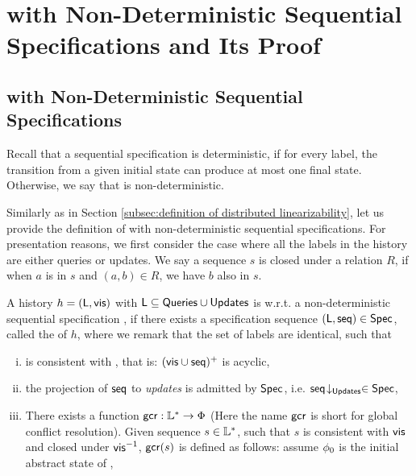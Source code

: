 \forget
{
\section{\crdtlin{} with Non-Deterministic Sequential Specifications and Its Proof}
\label{sec:appendix RA-linearizability with non-deterministic sequential specifications and its proof}



\subsection{\crdtlin{} with Non-Deterministic Sequential Specifications}
\label{subsec:appendix RA-linearizability with non-deterministic sequential specifications}

Recall that a sequential specification \Spec{} is deterministic, if for every label, the transition from a given initial state can produce at most one final state. Otherwise, we say that \Spec{} is non-deterministic.

Similarly as in Section \ref{subsec:definition of distributed linearizability}, let us provide the definition of \crdtlin{} with non-deterministic sequential specifications. For presentation reasons, we first consider the case where all the labels in the history are either queries or updates. We say a sequence $s$ is closed under a relation $R$, if when $a$ is in $s$ and $(a,b) \in R$, we have $b$ also in $s$.

\begin{definition}
\label{definition:ralinearizability1 with non-deterministic specifications}
A history $h = (\mathsf{L},\mathsf{vis})$ with $\mathsf{L}\subseteq \mathsf{Queries}\cup\mathsf{Updates}$ is \crdtlinearizable{} w.r.t. a non-deterministic sequential specification \Spec{}, if there exists a specification sequence $(\mathsf{L}, \mathsf{seq}) \in \mathsf{Spec}{}$, called the \emph{\crdtlinearization{}} of $h$, where we remark that the set of labels are identical, such that
\begin{enumerate}[(i)]
\item \aseqord{} is consistent with  \avisord{}, that is: $(\mathsf{vis} \cup \mathsf{seq})^{+}$ is acyclic,

\item the projection of $\mathsf{seq}$ to \emph{updates} is admitted by $\mathsf{Spec}$, i.e. $\mathsf{seq}\!\downarrow_{\mathsf{Updates}} \in \mathsf{Spec}$,

\item There exists a function $\mathsf{gcr}: \mathbb{L}^* \rightarrow \Phi$ (Here the name $\mathsf{gcr}$ is short for global conflict resolution). Given sequence $s \in \mathbb{L}^*$, such that $s$ is consistent with $\mathsf{vis}$ and closed under $\mathsf{vis}^{-1}$, $\mathsf{gcr}(s)$ is defined as follows: assume $\phi_0$ is the initial abstract state of \Spec{},


\end{enumerate}
\end{definition}}
